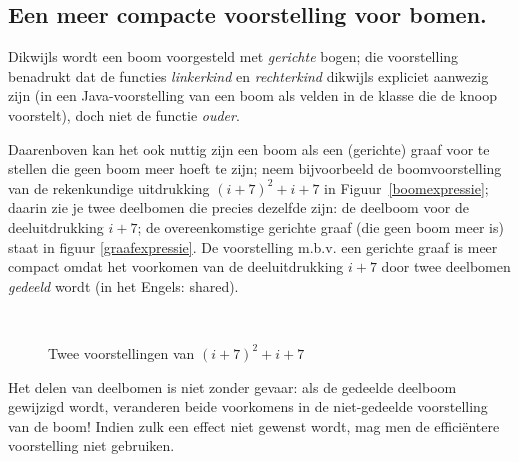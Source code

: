 \subsection{Een meer compacte voorstelling voor bomen.}

Dikwijls wordt een boom voorgesteld met {\em gerichte} bogen; die
voorstelling benadrukt dat de functies {\em linkerkind} en {\em rechterkind}
dikwijls expliciet aanwezig zijn (in een Java-voorstelling van een
boom als velden in de klasse die de knoop voorstelt), doch niet
de functie {\em ouder}.

Daarenboven kan het ook nuttig zijn een boom als een (gerichte) graaf
voor te stellen die geen boom meer hoeft te zijn; neem bijvoorbeeld de
boomvoorstelling van de rekenkundige uitdrukking $(i+7)^{2} + i + 7$
in Figuur~\ref{boomexpressie}; daarin zie je twee deelbomen die
precies dezelfde zijn: de deelboom voor de deeluitdrukking $i+7$; de
overeenkomstige gerichte graaf (die geen boom meer is) staat in figuur
\ref{graafexpressie}. De voorstelling m.b.v. een gerichte graaf is
meer compact omdat  het voorkomen van de deeluitdrukking $i+7$ door
twee deelbomen {\em gedeeld} wordt (in het Engels: shared).

\begin{figure}[ht]
\mbox{
\hspace{0.5cm}
\hspace{1cm}
}
\caption{Twee voorstellingen van $(i+7)^{2} + i + 7$}
\end{figure}

Het delen van deelbomen is niet zonder gevaar: als de gedeelde
deelboom gewijzigd wordt, veranderen beide voorkomens in de
niet-gedeelde voorstelling van de boom! Indien zulk een effect niet
gewenst wordt, mag men de effici\"entere voorstelling niet gebruiken.


